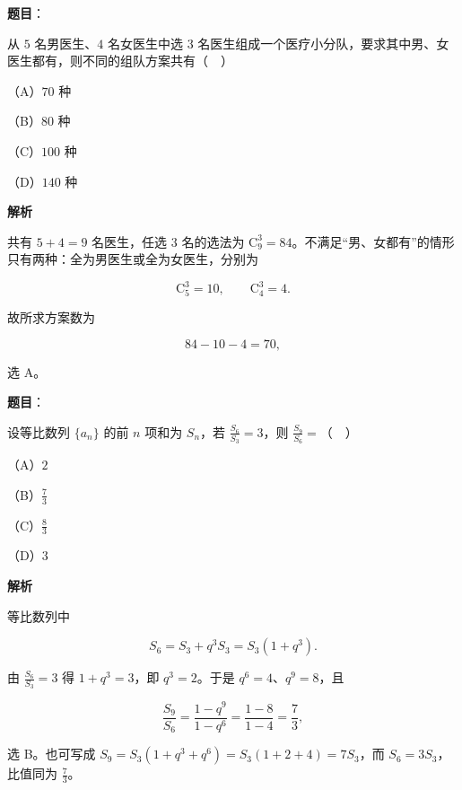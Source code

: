 \begin{answer}

\textbf{题目}：

从 $5$ 名男医生、$4$ 名女医生中选 $3$ 名医生组成一个医疗小分队，要求其中男、女医生都有，则不同的组队方案共有（　）

（A）$70$ 种

（B）$80$ 种

（C）$100$ 种

（D）$140$ 种

\textbf{解析}

共有 $5+4=9$ 名医生，任选 $3$ 名的选法为 $\mathrm C_9^3=84$。不满足“男、女都有”的情形只有两种：全为男医生或全为女医生，分别为

\nopagebreak[4]
\[\mathrm C_5^3=10,\qquad \mathrm C_4^3=4 .\]

故所求方案数为

\nopagebreak[4]
\[84-10-4=70,\]

选 A。


\end{answer}
\begin{answer}

\textbf{题目}：

设等比数列 $\{a_n\}$ 的前 $n$ 项和为 $S_n$，若 $\frac{S_6}{S_3}=3$，则 $\frac{S_9}{S_6}=$（　）

（A）$2$

（B）$\frac73$

（C）$\frac83$

（D）$3$

\textbf{解析}

等比数列中

\nopagebreak[4]
\[S_6=S_3+q^3S_3=S_3(1+q^3).\]

由 $\frac{S_6}{S_3}=3$ 得 $1+q^3=3$，即 $q^3=2$。于是 $q^6=4$、$q^9=8$，且

\nopagebreak[4]
\[\frac{S_9}{S_6}
=\frac{1-q^9}{1-q^6}
=\frac{1-8}{1-4}
=\frac73,\]

选 B。也可写成 $S_9=S_3(1+q^3+q^6)=S_3(1+2+4)=7S_3$，而 $S_6=3S_3$，比值同为 $\frac73$。


\end{answer}
